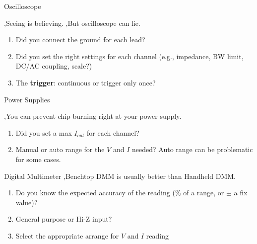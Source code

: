 \begin{textbox}{Oscilloscope}

\sep Seeing is believing. \sep But oscilloscope can lie.


\begin{enumerate}
    \item Did you connect the ground for each lead?
    \item Did you set the right settings for each channel
    (e.g., impedance, BW limit, DC/AC coupling, scale?)
    \item The \textbf{trigger}: continuous or trigger only once? 
\end{enumerate}
    
\end{textbox}

\begin{textbox}{Power Supplies}

\sep You can prevent chip burning right at your power supply.

 

\begin{enumerate}
    \item Did you set a max $I_{out}$ for each channel?
    \item Manual or auto range for the $V$ and $I$ needed? Auto range can be problematic for some cases.
\end{enumerate}
    
\end{textbox}

\begin{textbox}{Digital Multimeter}
\sep Benchtop DMM is usually better than Handheld DMM.


\begin{enumerate}
    \item Do you know the expected accuracy of the reading ($\%$ of a range, or $\pm$ a fix value)?
    \item General purpose or Hi-Z input?
    \item Select the appropriate arrange for $V$ and $I$ reading
\end{enumerate}
    
\end{textbox}



